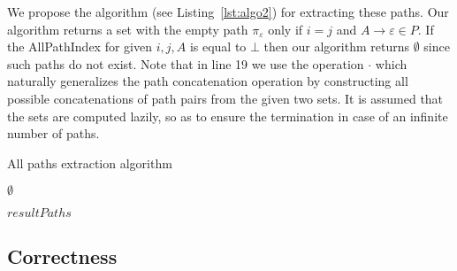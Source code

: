 We propose the algorithm (see Listing~\ref{lst:algo2}) for extracting these paths. Our algorithm returns a set with the empty path $\pi_{\varepsilon}$ only if $i = j$ and $A \to \varepsilon \in P$. If the AllPathIndex for given $i,j,A$ is equal to $\bot$ then our algorithm returns $\emptyset$ since such paths do not exist. Note that in line 19 we use
the operation $\cdot$ which naturally generalizes the path concatenation operation
by constructing all possible concatenations of path pairs from the given two
sets. It is assumed that the sets are computed lazily, so as to ensure the termination in case of an infinite number of paths.

\begin{algorithm}
	\small
	\begin{algorithmic}[1]
		\caption{All paths extraction algorithm}
		\label{lst:algo2}		
		
		\State \Return $\emptyset$
		\EndIf
		
		
		  
		\EndIf
		\EndFor
		\EndIf
		\Else {}
		\EndIf
		\EndFor
		\EndIf
		\EndFor
		\State \Return $resultPaths$
		\EndFunction
	\end{algorithmic}
\end{algorithm}

\subsection{Correctness}

